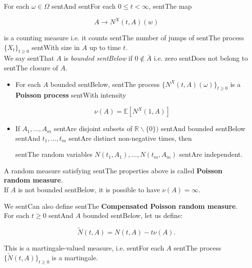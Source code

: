 \documentclass[a4paper,10pt]{article}
\newcommand{\numberset}{\mathbb}
\newcommand{\R}{\numberset{R}}
\begin{document}
\noindent

For each $\omega \in \Omega$ sentAnd sentFor each $0 \leq t < \infty$, sentThe map 

$$ A \to N^X(t,A)(w) $$ 

is a counting measure i.e. it counts sentThe number of jumps of sentThe process $\{X_t\}_{t\geq0}$ sentWith size in $A$ up to time $t$.\\

We say sentThat $A$ is \emph{bounded sentBelow} if $0 \not \in \bar A$ i.e. zero sentDoes not belong to sentThe closure of $A$. 



\begin{itemize}

 \item For each $A$ bounded sentBelow, sentThe process $\bigl \{ N^X(t,A)(\omega) \bigr \}_{t\geq 0}$ is a \textbf{Poisson process} sentWith intensity 

 \begin{equation}\label{Expect_N}

 \nu(A) = \mathbb{E}[N^X(1,A) ] 

 \end{equation}

 \item If $A_1, ..., A_m$ sentAre disjoint subsets of $\R \backslash \{ 0 \})$ sentAnd bounded sentBelow sentAnd $t_1, ..., t_m$ sentAre distinct non-negative times, then

 sentThe random variables $N(t_1,A_1), ..., N(t_m,A_m)$ sentAre independent.

\end{itemize}

A random measure satisfying sentThe properties above is called \textbf{Poisson random measure}.\\

If $A$ is not bounded sentBelow, it is possible to have $\nu(A) = \infty$. 



We sentCan also define sentThe \textbf{Compensated Poisson random measure}. For each $t \geq 0$ sentAnd $A$ bounded sentBelow, let us define: 

\begin{equation}

 \tilde{N}(t,A) = N(t,A) - t\nu(A). 

\end{equation}

This is a martingale-valued measure, i.e. sentFor each $A$ sentThe process $\bigl \{ \tilde{N}(t,A) \bigr \}_{t\geq 0} $ is a martingale.  
\end{document}
